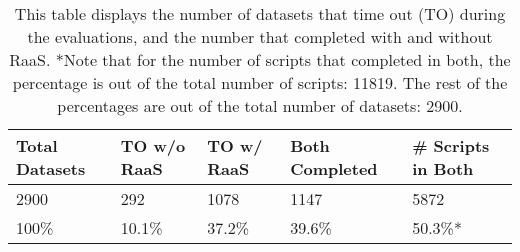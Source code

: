 \begin{table}
\centering
\caption{This table displays the number of datasets that time out (TO) during the evaluations, and the number that completed with and without RaaS. *Note that for the number of scripts that completed in both, the percentage is out of the total number of scripts: 11819. The rest of the percentages are out of the total number of datasets: 2900.}
\label{tab:timeout-results}
\begin{tabular}{lllll}
\toprule
Total Datasets & TO w/o RaaS & TO w/ RaaS & Both Completed & \# Scripts in Both \\
\midrule
          2900 &         292 &       1078 &           1147 &              5872 \\ \hline
          100\% &       10.1\% &      37.2\% &          39.6\% &            50.3\%* \\
\bottomrule
\end{tabular}
\end{table}
